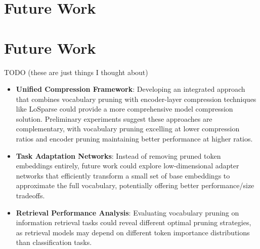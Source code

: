 \documentclass[twocolumn]{article}
\begin{document}

\section{Future Work}

\section{Future Work}
TODO (these are just things I thought about)
\begin{itemize}
    \item \textbf{Unified Compression Framework}: Developing an integrated approach that combines vocabulary pruning with encoder-layer compression techniques like LoSparse could provide a more comprehensive model compression solution. Preliminary experiments suggest these approaches are complementary, with vocabulary pruning excelling at lower compression ratios and encoder pruning maintaining better performance at higher ratios.
    
    \item \textbf{Task Adaptation Networks}: Instead of removing pruned token embeddings entirely, future work could explore low-dimensional adapter networks that efficiently transform a small set of base embeddings to approximate the full vocabulary, potentially offering better performance/size tradeoffs.
    
    \item \textbf{Retrieval Performance Analysis}: Evaluating vocabulary pruning on information retrieval tasks could reveal different optimal pruning strategies, as retrieval models may depend on different token importance distributions than classification tasks.
\end{itemize}

\newpage
\onecolumn


\end{document}
